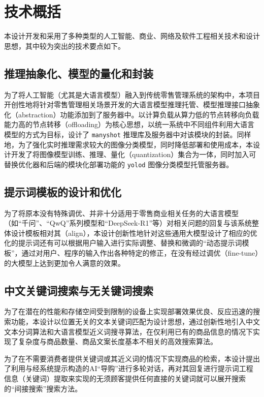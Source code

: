 \newpage
\section{技术概括}
\label{sec:tek-summary}

本设计开发和采用了多种类型的人工智能、商业、网络及软件工程相关技术和设计思想，其中较为突出的技术要点如下。

\subsection{推理抽象化、模型的量化和封装}

为了将人工智能（尤其是大语言模型）融入到传统零售管理系统的架构中，本项目开创性地将针对零售管理相关场景开发的大语言模型推理托管、模型推理接口抽象化（abstraction）功能添加到了服务器中。以计算负载从算力低的节点转移向负载能力高的节点转移（offloading）为核心思想，以统一系统中不同组件利用大语言模型的方式为目标，设计了 \verb|manyshot| 推理库及服务器中对该模块的封装。同样地，为了强化实时推理需求较大的图像分类模型，同时降低部署和使用成本，本设计开发了将图像模型训练、推理、量化（quantization）集合为一体，同时加入可替换优化器和后端的模块化部署功能的 \verb|yolod| 图像分类模型托管服务器。

\subsection{提示词模板的设计和优化}

为了将原本没有特殊调优、并非十分适用于零售商业相关任务的大语言模型（如“千问”、“QwQ”系列模型和“DeepSeek-R1”等）对相关问题的回复与该系统整体设计模板相对其（align），本设计创新性地针对这些通用大模型设计了相应的优化的提示词还有可以根据用户输入进行实际调整、替换和微调的“动态提示词模板”，通过对用户、程序的输入作出各种特定的修正，在没有经过调优（fine-tune）的大模型上达到更加令人满意的效果。

\subsection{中文关键词搜索与无关键词搜索}

为了在潜在的性能和存储空间受到限制的设备上实现部署效果优良、反应迅速的搜索功能，本设计以位置无关的文本关键词匹配为设计思想，通过创新性地引入中文文本分词算法和大语言模型近义词搜寻算法，在仅利用已有的商品信息的情况下实现了复杂度与商品数量、商品文案长度基本不相关的高效搜索算法。

为了在不需要消费者提供关键词或其近义词的情况下实现商品的检索，本设计提出了利用与经系统提示构造的AI“导购”进行多轮对话，再对其回复进行提示词工程信息（关键词）提取来实现的无须顾客提供任何直接的关键词就可以展开搜索的“间接搜索”搜索方法。